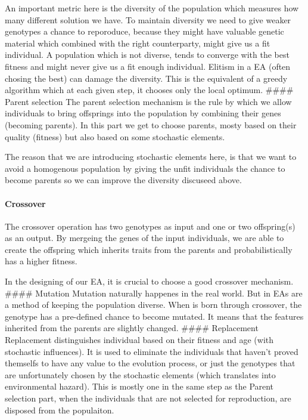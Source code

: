 \documentclass[11pt]{article}
\begin{document}
An important metric here is the diversity of the population which
measures how many different solution we have. To maintain diversity we
need to give weaker genotypes a chance to reporoduce, because they might
have valuable genetic material which combined with the right
counterparty, might give us a fit individual. A population which is not
diverse, tends to converge with the best fitness and might never give us
a fit enough individual. Elitism in a EA (often chosing the best) can
damage the diversity. This is the equivalent of a greedy algorithm which
at each given step, it chooses only the local optimum. \#\#\#\# Parent
selection The parent selection mechanism is the rule by which we allow
individuals to bring offsprings into the population by combining their
genes (becoming parents). In this part we get to choose parents, mosty
based on their quality (fitness) but also based on some stochastic
elements.

The reason that we are introducing stochastic elements here, is that we
want to avoid a homogenous population by giving the unfit individuals
the chance to become parents so we can improve the diversity discuseed
above.

\hypertarget{crossover}{%
\paragraph{Crossover}\label{crossover}}

The crossover operation has two genotypes as input and one or two
offspring(s) as an output. By mergeing the genes of the input
individuals, we are able to create the offspring which inherits traits
from the parents and probabilistically has a higher fitness.

In the designing of our EA, it is crucial to choose a good crossover
mechanism. \#\#\#\# Mutation Mutation naturally happenes in the real
world. But in EAs are a method of keeping the population diverse. When
is born through crossover, the genotype has a pre-defined chance to
become mutated. It means that the features inherited from the parents
are slightly changed. \#\#\#\# Replacement Replacement distinguishes
individual based on their fitness and age (with stochastic influences).
It is used to eliminate the individuals that haven't proved themselfs to
have any value to the evolution process, or just the genotypes that are
unfortunately chosen by the stochastic elements (which translates into
environmental hazard). This is mostly one in the same step as the Parent
selection part, when the individuals that are not selected for
reproduction, are disposed from the populaiton.
\end{document}
